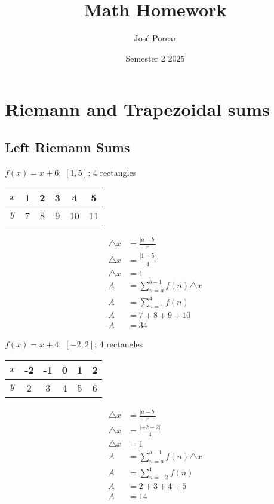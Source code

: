 \documentclass[12pt]{article}
\begin{document}
\title{\Huge \textbf {Math Homework}}
\author{José Porcar}
\date{Semester 2 2025}
\maketitle
\tableofcontents
\newpage

\section{Riemann and Trapezoidal sums}

\subsection*{Left Riemann Sums}
\begin{multicols}{2}

$f(x)=x+6; \; [1,5]$; 4 rectangles

\begin{center}
    \begin{tabular}{ c|c|c|c|c|c }
        $x$ & 1 & 2 & 3 & 4 & 5 \\
        \hline
        $y$ & 7 & 8 & 9 & 10 & 11 \\
    \end{tabular}
    \begin{align*}
        \triangle x &= \frac{|a-b|}{r} \\
        \triangle x &= \frac{|1-5|}{4} \\
        \triangle x &= 1 \\
        A &= \sum_{n=a}^{b-1} f(n)\triangle x \\ 
        A &= \sum_{n=1}^4 f(n) \\
        A &= 7 + 8 + 9 + 10 \\
        A &= 34
    \end{align*}
\end{center}

\columnbreak 
$f(x)=x+4; \; [-2,2]$; 4 rectangles

\begin{center}
    \begin{tabular}{ c|c|c|c|c|c }
        $x$ & -2 & -1 & 0 & 1 & 2 \\
        \hline
        $y$ & 2 & 3 & 4 & 5 & 6 \\
    \end{tabular}
    \begin{align*}
        \triangle x &= \frac{|a-b|}{r} \\
        \triangle x &= \frac{|-2-2|}{4} \\
        \triangle x &= 1 \\
        A &= \sum_{n=a}^{b-1} f(n)\triangle x \\ 
        A &= \sum_{n=-2}^1 f(n) \\
        A &= 2 + 3 + 4 + 5 \\
        A &= 14
    \end{align*}
\end{center}
\end{multicols}
\end{document}
